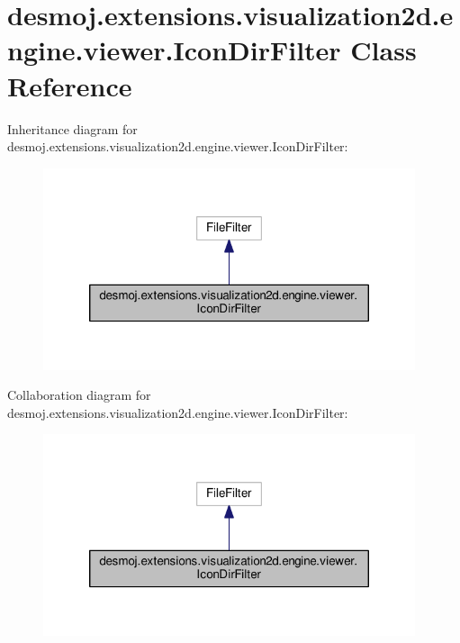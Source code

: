 \section{desmoj.\-extensions.\-visualization2d.\-engine.\-viewer.\-Icon\-Dir\-Filter Class Reference}
\label{classdesmoj_1_1extensions_1_1visualization2d_1_1engine_1_1viewer_1_1_icon_dir_filter}


Inheritance diagram for desmoj.\-extensions.\-visualization2d.\-engine.\-viewer.\-Icon\-Dir\-Filter\-:
\nopagebreak
\begin{figure}[H]
\begin{center}
\leavevmode
\includegraphics[width=310pt]{classdesmoj_1_1extensions_1_1visualization2d_1_1engine_1_1viewer_1_1_icon_dir_filter__inherit__graph}
\end{center}
\end{figure}


Collaboration diagram for desmoj.\-extensions.\-visualization2d.\-engine.\-viewer.\-Icon\-Dir\-Filter\-:
\nopagebreak
\begin{figure}[H]
\begin{center}
\leavevmode
\includegraphics[width=310pt]{classdesmoj_1_1extensions_1_1visualization2d_1_1engine_1_1viewer_1_1_icon_dir_filter__coll__graph}
\end{center}
\end{figure}

